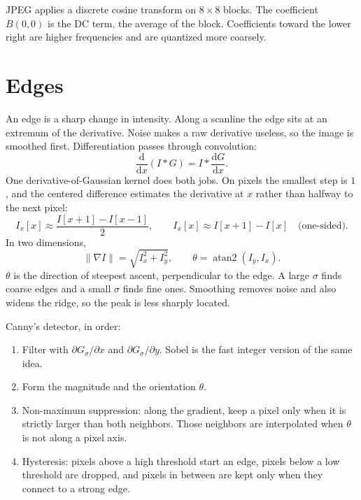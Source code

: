 \documentclass[11pt]{article}
\newcommand{\img}{I}
\newcommand{\conv}{\ast}
\begin{document}
JPEG applies a discrete cosine transform on $8\times 8$ blocks. The coefficient $B(0,0)$ is the DC term, the average of the block. Coefficients toward the lower right are higher frequencies and are quantized more coarsely.

\section{Edges}

An edge is a sharp change in intensity. Along a scanline the edge sits at an extremum of the derivative. Noise makes a raw derivative useless, so the image is smoothed first. Differentiation passes through convolution:
\begin{equation}
\frac{\mathrm{d}}{\mathrm{d}x}(\img\conv G)
=
\img\conv\frac{\mathrm{d}G}{\mathrm{d}x}.
\end{equation}
One derivative-of-Gaussian kernel does both jobs. On pixels the smallest step is $1$, and the centered difference estimates the derivative at $x$ rather than halfway to the next pixel:
\begin{equation}
\img_x[x]\approx\frac{\img[x+1]-\img[x-1]}{2},
\qquad
\img_x[x]\approx\img[x+1]-\img[x]
\quad\text{(one-sided).}
\end{equation}
In two dimensions,
\begin{equation}
\|\nabla\img\|=\sqrt{\img_x^2+\img_y^2},
\qquad
\theta=\operatorname{atan2}(\img_y,\img_x).
\end{equation}
$\theta$ is the direction of steepest ascent, perpendicular to the edge. A large $\sigma$ finds coarse edges and a small $\sigma$ finds fine ones. Smoothing removes noise and also widens the ridge, so the peak is less sharply located.

Canny's detector, in order:
\begin{enumerate}
\item Filter with $\partial G_\sigma/\partial x$ and $\partial G_\sigma/\partial y$. Sobel is the fast integer version of the same idea.
\item Form the magnitude and the orientation $\theta$.
\item Non-maximum suppression: along the gradient, keep a pixel only when it is strictly larger than both neighbors. Those neighbors are interpolated when $\theta$ is not along a pixel axis.
\item Hysteresis: pixels above a high threshold start an edge, pixels below a low threshold are dropped, and pixels in between are kept only when they connect to a strong edge.
\end{enumerate}
\end{document}
